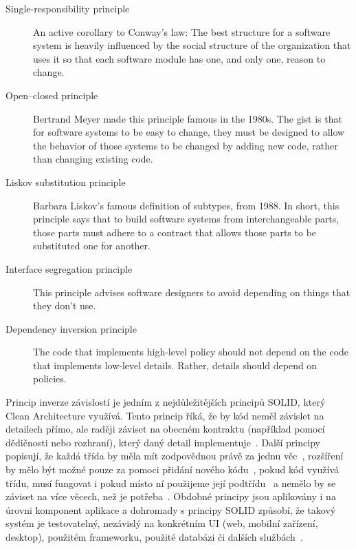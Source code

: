 \begin{description}
    \item[Single-responsibility principle] An active corollary to Conway’s law: The best structure for a software system is heavily influenced
    by the social structure of the organization that uses it so that
    each software module has one, and only one, reason to change.
    \item[Open--closed principle] Bertrand Meyer made this principle famous
    in the 1980s.
    The gist is that for software systems to be easy to change,
    they must be designed to allow the behavior of those systems to be changed
    by adding new code,
    rather than changing existing code.
    \item[Liskov substitution principle] Barbara Liskov’s famous definition of
    subtypes, from 1988.
    In short, this principle says that to build software systems from
    interchangeable parts,
    those parts must adhere to a contract that allows those parts to be
    substituted one for another.
    \item[Interface segregation principle] This principle advises software
    designers to avoid depending on things that they don’t use.
    \item[Dependency inversion principle] The code that implements high-level
    policy should not depend on the code that implements low-level details.
    Rather, details should depend on policies.
\end{description}

Princip inverze závislostí je jedním z nejdůležitějších principů SOLID,
který Clean Architecture využívá. 
Tento princip říká,
že by kód neměl závislet na detailech přímo,
ale raději záviset na obecném kontraktu (například pomocí dědičnosti nebo rozhraní),
který daný detail implementuje~\cite[kapitola~11]{martin_clean_architecture}.
Další principy popisují,
že každá třída by měla mít zodpovědnou právě za jednu
věc~\cite[kapitola~7]{martin_clean_architecture},
rozšíření by mělo být možné pouze za pomoci přidání nového
kódu~\cite[kapitola~8]{martin_clean_architecture},
pokud kód využívá třídu,
musí fungovat i pokud místo ní použijeme její
podtřídu~\cite[kapitola~8]{martin_clean_architecture}
a nemělo by se záviset na více věcech,
než je potřeba~\cite[kapitola10]{martin_clean_architecture}.
Obdobné principy jsou aplikovány i na úrovni komponent aplikace
a dohromady s principy SOLID způsobí,
že takový systém je testovatelný,
nezávislý na konkrétním UI (web, mobilní zařízení, desktop),
použitém frameworku, použité databázi či dalších
službách~\cite{the_clean_architecture}.

